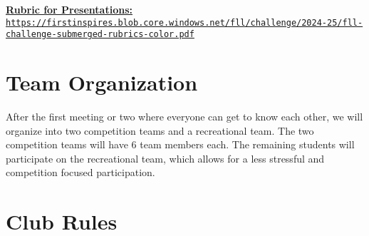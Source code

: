 \documentclass[letter]{article}
\begin{document}
\href{https://firstinspires.blob.core.windows.net/fll/challenge/2024-25/fll-challenge-submerged-rubrics-color.pdf}{\textbf{Rubric for Presentations:} \nolinkurl{https://firstinspires.blob.core.windows.net/fll/challenge/2024-25/fll-challenge-submerged-rubrics-color.pdf}}

\section{Team Organization}

After the first meeting or two where everyone can get to know each other, we will organize into two competition teams and a recreational team.  The two competition teams will have 6 team members each.  The remaining students will participate on the recreational team, which allows for a less stressful and competition focused participation.  

\section{Club Rules}
\end{document}
